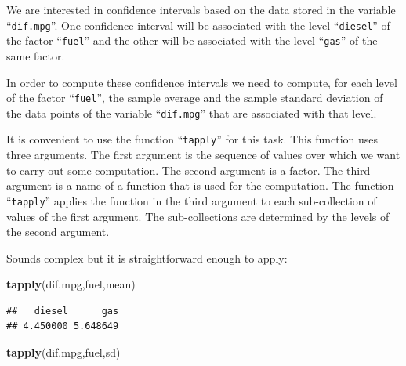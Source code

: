 \documentclass[
]{krantz}
\makeatletter
\newenvironment{Shaded}{\begin{snugshade}}{\end{snugshade}}
\newcommand{\KeywordTok}[1]{\textcolor[rgb]{0.13,0.29,0.53}{\textbf{#1}}}
\newcommand{\NormalTok}[1]{#1}
\newcommand{\OperatorTok}[1]{\textcolor[rgb]{0.81,0.36,0.00}{\textbf{#1}}}
\newcommand{\StringTok}[1]{\textcolor[rgb]{0.31,0.60,0.02}{#1}}
\newenvironment{kframe}{%
\medskip{}
\setlength{\fboxsep}{.8em}
 \def\at@end@of@kframe{}%
 \ifinner\ifhmode%
  \def\at@end@of@kframe{\end{minipage}}%
  \begin{minipage}{\columnwidth}%
 \fi\fi%
 \def\FrameCommand##1{\hskip\@totalleftmargin \hskip-\fboxsep
 \colorbox{shadecolor}{##1}\hskip-\fboxsep
     \hskip-\linewidth \hskip-\@totalleftmargin \hskip\columnwidth}%
 \MakeFramed {\advance\hsize-\width
   \@totalleftmargin\z@ \linewidth\hsize
   \@setminipage}}%
 {\par\unskip\endMakeFramed%
 \at@end@of@kframe}
\renewenvironment{Shaded}{\begin{kframe}}{\end{kframe}}
\theoremstyle{definition}
\theoremstyle{definition}
\theoremstyle{definition}
\theoremstyle{remark}
\makeatother
\begin{document}
\begin{Shaded}
\end{Shaded}

We are interested in confidence intervals based on the data stored in
the variable ``\texttt{dif.mpg}''. One confidence interval will be associated
with the level ``\texttt{diesel}'' of the factor ``\texttt{fuel}'' and the other will be
associated with the level ``\texttt{gas}'' of the same factor.

In order to compute these confidence intervals we need to compute, for
each level of the factor ``\texttt{fuel}'', the sample average and the sample
standard deviation of the data points of the variable ``\texttt{dif.mpg}'' that
are associated with that level.

It is convenient to use the function ``\texttt{tapply}'' for this task. This
function uses three arguments. The first argument is the sequence of
values over which we want to carry out some computation. The second
argument is a factor. The third argument is a name of a function that is
used for the computation. The function ``\texttt{tapply}'' applies the function
in the third argument to each sub-collection of values of the first
argument. The sub-collections are determined by the levels of the second
argument.

Sounds complex but it is straightforward enough to apply:

\begin{Shaded}
\begin{Highlighting}[]
\KeywordTok{tapply}\NormalTok{(dif.mpg,fuel,mean)}
\end{Highlighting}
\end{Shaded}

\begin{verbatim}
##   diesel      gas 
## 4.450000 5.648649
\end{verbatim}

\begin{Shaded}
\begin{Highlighting}[]
\KeywordTok{tapply}\NormalTok{(dif.mpg,fuel,sd)}
\end{Highlighting}
\end{Shaded}
\end{document}
